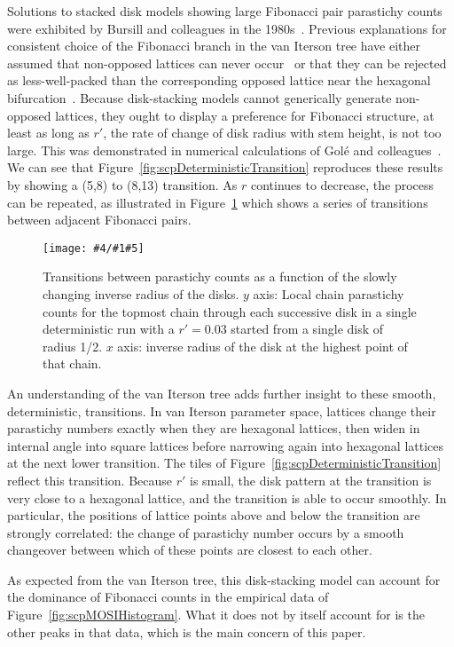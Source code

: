 \documentclass[a4paper,10pt]{amsart}
\newlength{\jfigwidth}
\newcommand{\pdffig}[3]{\jdofig{#1}{#2}{#3}{Figures}{.pdf}}
\newcommand{\jdofig}[5]{
	\begin{figure}\centering\texttt{[image: \#4/\#1\#5]} \caption{#2}\label{fig:#1}\end{figure}
}
\begin{document}
Solutions to stacked disk models showing large Fibonacci pair parastichy counts were exhibited by Bursill and colleagues in the 1980s~\cite{jeanBib41,jeanBib721}.  Previous explanations for consistent choice of the Fibonacci branch in the van Iterson tree have either assumed that non-opposed lattices can never occur~\cite{mitchisonPhyllotaxisFibonacciSeries1977} or that they can be rejected as less-well-packed than the corresponding opposed lattice near the hexagonal bifurcation~\cite{douadyCh21Phyllotactic1998}. Because disk-stacking models cannot generically generate non-opposed lattices, they ought to display a preference for Fibonacci structure, at least as long as $r'$, the rate of change of disk radius with stem height,  is not too large. This was demonstrated in  numerical calculations of Gol\'e and colleagues~\cite{goleFibonacciQuasisymmetricPhyllotaxis2016}. We can see that Figure~\ref{fig:scpDeterministicTransition} reproduces these results by showing a (5,8) to (8,13) transition.
As $r$ continues to decrease, the process can be repeated, as illustrated in  Figure~\ref{fig:scpParastichyCountsTo89} which shows a series of transitions between adjacent Fibonacci pairs.  
%
\pdffig{scpParastichyCountsTo89}{Transitions between parastichy counts as a function of the slowly changing inverse radius of the disks. $y$ axis: Local chain parastichy counts for the topmost chain through each successive disk in a single
	deterministic run with a  $r'=0.03$ started from a single disk of radius 1/2. $x$ axis: inverse radius of the disk at the highest point of that chain.}{1}
%


An understanding of the van Iterson tree adds further insight to these smooth, deterministic, transitions. In van Iterson parameter space, lattices change their parastichy numbers exactly when they are hexagonal lattices, then widen in internal angle into square lattices before narrowing again into hexagonal lattices at the next lower transition.  The tiles of Figure~\ref{fig:scpDeterministicTransition} reflect this transition. Because $r'$ is small, the disk pattern at the transition is very close to a hexagonal lattice, and the transition is able to occur smoothly. In particular, the positions of lattice points above and below the transition are strongly correlated: the change of parastichy number occurs by a smooth changeover between which of these points are closest to each other. 



As expected from the van Iterson tree, this disk-stacking model can account for the dominance of Fibonacci counts in the empirical data of Figure~\ref{fig:scpMOSIHistogram}.  What it does not by itself account for is the other peaks in that data, which is the main concern of this paper. 
\end{document}
